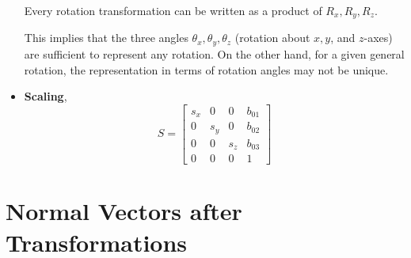 \documentclass[letterpaper,12pt]{article}
\begin{document}
\begin{itemize}
    \begin{theorem}
    Every rotation transformation can be written as a product of $R_x, R_y, R_z$.
    \end{theorem}
    This implies that the three angles $\theta_x, \theta_y, \theta_z$ (rotation about $x, y$, and $z$-axes) are sufficient to represent any rotation. On the other hand, for a given general rotation, the representation in terms of rotation angles may not be unique.
    \item \textbf{Scaling},
    \begin{equation*}
        S = \begin{bmatrix} s_x & 0 & 0 & b_{01} \\ 0 & s_y & 0 & b_{02} \\ 0 & 0 & s_z & b_{03} \\ 0 & 0 & 0 & 1 \end{bmatrix}
    \end{equation*}
\end{itemize}



\section*{Normal Vectors after Transformations}
\end{document}
